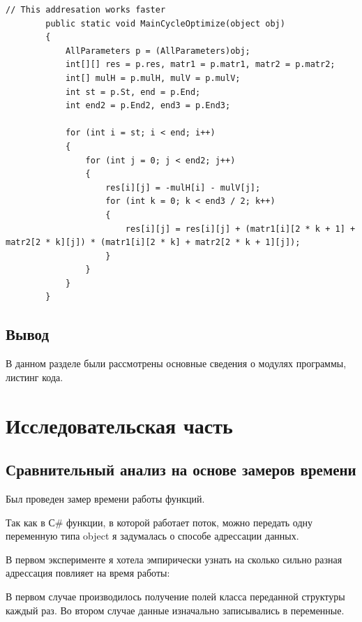 \documentclass[12pt]{report}
\begin{document}
\begin{lstlisting}[label=some-code,caption=Распараллеленный главный цикл с оптимизацией адрессации]
        // This addresation works faster
        public static void MainCycleOptimize(object obj)
        {
            AllParameters p = (AllParameters)obj;
            int[][] res = p.res, matr1 = p.matr1, matr2 = p.matr2;
            int[] mulH = p.mulH, mulV = p.mulV;
            int st = p.St, end = p.End;
            int end2 = p.End2, end3 = p.End3;

            for (int i = st; i < end; i++)
            {
                for (int j = 0; j < end2; j++)
                {
                    res[i][j] = -mulH[i] - mulV[j];
                    for (int k = 0; k < end3 / 2; k++)
                    {
                        res[i][j] = res[i][j] + (matr1[i][2 * k + 1] + matr2[2 * k][j]) * (matr1[i][2 * k] + matr2[2 * k + 1][j]);
                    }
                }
            }
        }
\end{lstlisting}

\section{Вывод}
В данном разделе были рассмотрены основные сведения о модулях программы, листинг кода.


\chapter{Исследовательская часть}

\section{Сравнительный анализ на основе замеров времени}

Был проведен замер времени работы функций.

Так как в С\# функции, в которой работает поток, можно передать одну переменную типа object я задумалась о способе адрессации данных.

В первом эксперименте я хотела эмпирически узнать на сколько сильно разная адрессация повлияет на время работы:  

В первом случае производилось получение полей класса переданной структуры каждый раз. 
Во втором случае данные изначально записывались в переменные.
\end{document}

